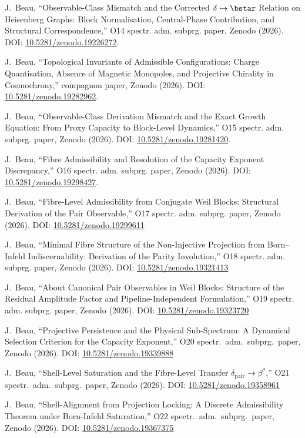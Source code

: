 J.~Beau,
``Observable-Class Mismatch and the Corrected $\delta \mapsto \bstar$ Relation on Heisenberg Graphs:
Block Normalisation, Central-Phase Contribution,
and Structural Correspondence,''
O14 spectr. adm. subprg. paper, Zenodo (2026).
DOI: \href{https://doi.org/10.5281/zenodo.19226272}{10.5281/zenodo.19226272}.

J.~Beau,
``Topological Invariants of Admissible Configurations: Charge Quantisation, Absence of Magnetic Monopoles, and
Projective Chirality in Cosmochrony,''
compagnon paper, Zenodo (2026).
DOI: \href{https://doi.org/10.5281/zenodo.19282962}{10.5281/zenodo.19282962}.

J.~Beau,
``Observable-Class Derivation Mismatch and the Exact Growth Equation: From Proxy Capacity to Block-Level Dynamics,''
O15 spectr. adm. subprg. paper, Zenodo (2026).
DOI: \href{https://doi.org/10.5281/zenodo.19281420}{10.5281/zenodo.19281420}.

J.~Beau,
``Fibre Admissibility and Resolution of the Capacity Exponent Discrepancy,''
O16 spectr. adm. subprg. paper, Zenodo (2026).
DOI: \href{https://doi.org/10.5281/zenodo.19298427}{10.5281/zenodo.19298427}.

J.~Beau,
``Fibre-Level Admissibility from Conjugate Weil Blocks: Structural Derivation of the Pair Observable,''
O17 spectr. adm. subprg. paper, Zenodo (2026).
DOI: \href{https://doi.org/10.5281/zenodo.19299611}{10.5281/zenodo.19299611}

J.~Beau,
``Minimal Fibre Structure of the Non-Injective Projection from Born--Infeld Indiscernability:
Derivation of the Parity Involution,''
O18 spectr. adm. subprg. paper, Zenodo (2026).
DOI: \href{https://doi.org/10.5281/zenodo.19321413}{10.5281/zenodo.19321413}

J.~Beau,
``About Canonical Pair Observables in Weil Blocks: Structure of the Residual Amplitude Factor and Pipeline-Independent
Formulation,''
O19 spectr. adm. subprg. paper, Zenodo (2026).
DOI: \href{https://doi.org/10.5281/zenodo.19323720}{10.5281/zenodo.19323720}

J.~Beau,
``Projective Persistence and the Physical Sub-Spectrum: A
Dynamical Selection Criterion for the Capacity Exponent,''
O20 spectr.\ adm.\ subprg.\ paper, Zenodo (2026).
DOI: \href{https://doi.org/10.5281/zenodo.19339888}{10.5281/zenodo.19339888}

J.~Beau,
``Shell-Level Saturation and the Fibre-Level Transfer
$\delta_{\mathrm{pair}} \to \beta^*$,''
O21 spectr.\ adm.\ subprg.\ paper, Zenodo (2026).
DOI: \href{https://doi.org/10.5281/zenodo.19358961}{10.5281/zenodo.19358961}

J.~Beau,
``Shell-Alignment from Projection Locking: A Discrete Admissibility Theorem under Born-Infeld Saturation,''
O22 spectr.\ adm.\ subprg.\ paper, Zenodo (2026).
DOI: \href{https://doi.org/10.5281/zenodo.19367375}{10.5281/zenodo.19367375}
